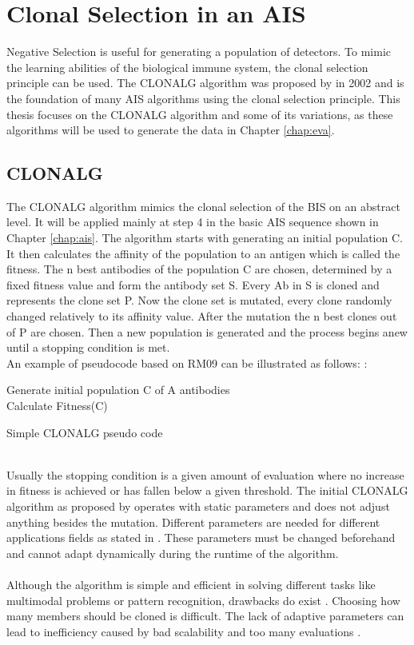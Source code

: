 \section{Clonal Selection in an AIS}
Negative Selection is useful for generating a population of detectors. To mimic the learning abilities of the biological immune system, the clonal selection principle can be used. The CLONALG algorithm was proposed by \cite{DEC02} in 2002 and is the foundation of many AIS algorithms using the clonal selection principle. This thesis focuses on the CLONALG algorithm and some of its variations, as these algorithms will be used to generate the data in Chapter \ref{chap:eva}.
\subsection{CLONALG}
The CLONALG algorithm mimics the clonal selection of the BIS on an abstract level. It will be applied mainly at step 4 in the basic AIS sequence shown in Chapter \ref{chap:ais}. The algorithm starts with generating an initial population C. It then calculates the affinity of the population to an antigen which is called the fitness. The n best antibodies of the population C are chosen, determined by a fixed fitness value and form the antibody set S. Every Ab in S is cloned and represents the clone set P. Now the clone set is mutated, every clone randomly changed relatively to its affinity value. After the mutation the n best clones out of P are chosen. Then a new population is generated and the process begins anew until a stopping condition is met.\\
An example of pseudocode based on RM09 can be illustrated as follows: \cite{RIFF09}:
\begin{algorithm}
	Generate initial population C of A antibodies\\
	Calculate Fitness(C)\\
	\caption{Simple CLONALG pseudo code}
\end{algorithm}\\
Usually the stopping condition is a given amount of evaluation where no increase in fitness is achieved or has fallen below a given threshold. The initial CLONALG algorithm as proposed by \cite{DEC02} operates with static parameters and does not adjust anything besides the mutation. Different parameters are needed for different applications fields as stated in \cite{DEC02}. These parameters must be changed beforehand and cannot adapt dynamically during the runtime of the algorithm.\\\\
Although the algorithm is simple and efficient in solving different tasks like multimodal problems or pattern recognition, drawbacks do exist \cite{Garret04}. Choosing how many members should be cloned is difficult. The lack of adaptive parameters can lead to inefficiency caused by bad scalability and too many evaluations \cite{Garret04}.
